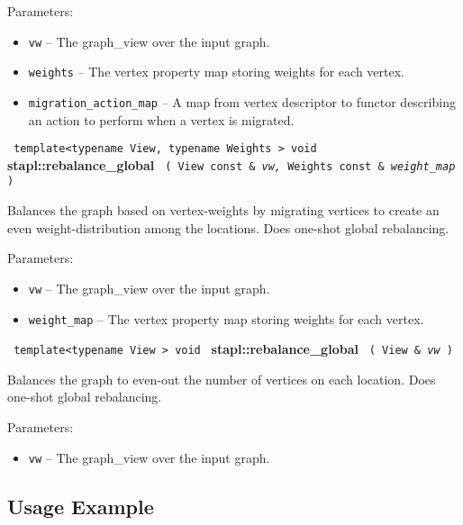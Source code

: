Parameters:
\begin{itemize}
\item
\texttt{vw} --
The graph\_view over the input graph.
\item
\texttt{weights} --
The vertex property map storing weights for each vertex.
\item
\texttt{migration\_action\_map} --
A map from vertex descriptor to functor describing an action to perform when a vertex is migrated.
\end{itemize}


\texttt{%
template<typename View, typename Weights >
\newline
void 
}
\textbf{stapl::rebalance\_global}%
\newline
\texttt{%
(
View const \& 
\textit{vw,}%
Weights const \&
\textit{weight\_map}%
)     
}
\vspace{0.4cm}

Balances the graph based on vertex-weights by migrating vertices to create an even weight-distribution among the locations. Does one-shot global rebalancing.

Parameters:
\begin{itemize}
\item
\texttt{vw} --
The graph\_view over the input graph.
\item
\texttt{weight\_map} --
The vertex property map storing weights for each vertex.
\end{itemize}


\texttt{%
template<typename View >
\newline
void 
}
\textbf{stapl::rebalance\_global}%
\newline
\texttt{%
(
View \&
\textit{vw}%
)    
}

Balances the graph to even-out the number of vertices on each location. Does one-shot global rebalancing.

Parameters:
\begin{itemize}
\item
\texttt{vw} --
The graph\_view over the input graph.
\end{itemize}

\subsection{Usage Example} \label{sec-rebal-glob-alg-use}

